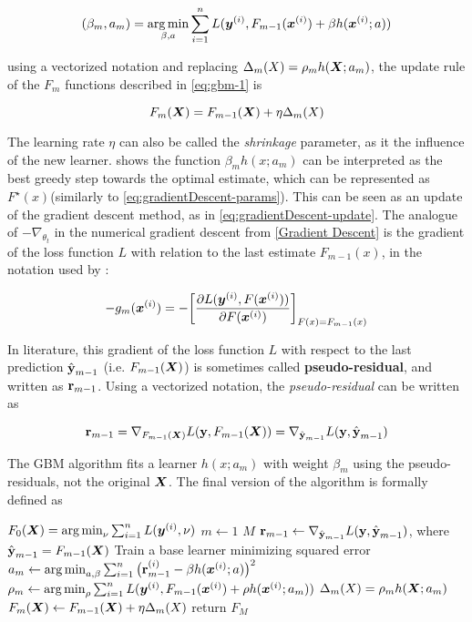 \begin{equation*}
    (\beta_m, a_m) = \operatorname*{arg\,min}_{\beta, a} \sum_{i=1}^n L(\bm{y}^{(i)}, F_{m-1}(\bm{x}^{(i)}) + \beta h(\bm{x}^{(i)}; a))
\end{equation*}

using a vectorized notation and replacing $\Delta_m(X) =\rho_m h(\bm{X}; a_m)$,  the update rule of the $F_m$ functions described in \ref{eq:gbm-1} is

\begin{equation}\label{eq:gbm-eta}
    F_m(\bm{X}) = F_{m-1}(\bm{X}) + \eta \Delta_m(X)
\end{equation}

The learning rate $\eta$ can also be called the \textit{shrinkage} parameter, as it  the influence of the new learner. \cite{gbmdef} shows the function $\beta_mh(x; a_m)$ can be interpreted as the best greedy step towards the optimal estimate, which can be represented as $F^\star(x)$(similarly to \ref{eq:gradientDescent-params}). This can be seen as an update of the gradient descent method, as in \ref{eq:gradientDescent-update}. The analogue of $-\nabla_{\theta_{t}}$ in the numerical gradient descent from \ref{Gradient Descent} is the gradient of the loss function $L$ with relation to the last estimate $F_{m-1}(x)$, in the notation used by \cite{gbmdef}:

\begin{equation*}
    -g_m(\bm{x}^{(i)}) = -\bigg[\frac{\partial L(\bm{y}^{(i)}, F(\bm{x}^{(i)}))}{\partial F(\bm{x}^{(i)})}\bigg]_{F(x)=F_{m-1}(x)}
\end{equation*}

In literature, this gradient of the loss function $L$ with respect to the last prediction $\hat{\textbf{{\text{\textup{y}}}}}_{m-1}$ (i.e. $F_{m-1}(\bm{X})$) is sometimes called \textbf{pseudo-residual}, and written as $\textbf{{\text{\textup{r}}}}_{m-1}$. Using a vectorized notation, the \textit{pseudo-residual} can be written as

\begin{equation*}
    \textbf{{\text{\textup{r}}}}_{m-1} = \nabla_{F_{m-1}(\bm{X})}L(\textbf{\text{\textup{y}}}, F_{m-1}(\bm{X})) = \nabla_{\hat{\textbf{{\text{\textup{y}}}}}_{m-1}}L(\textbf{\text{\textup{y}}},\hat{\textbf{{\text{\textup{y}}}}}_{m-1})
\end{equation*}


The GBM algorithm fits a learner $h(x; a_m)$ with weight $\beta_m$ using the pseudo-residuals, not the original $\bm{X}$. The final version of the algorithm is formally defined as

\begin{codebox}
    \li $F_0(\bm{X}) = \operatorname*{arg\,min}_{\nu}\sum_{i=1}^n L(\bm{y}^{(i)}, \nu)$
    \li \For $m \gets 1$ \To $M$
    \li     \Do
                $\textbf{{\text{\textup{r}}}}_{m-1} \gets \nabla_{\hat{\textbf{{\text{\textup{y}}}}}_{m-1}}L(\textbf{\text{\textup{y}}},\hat{\textbf{{\text{\textup{y}}}}}_{m-1})$, where $\hat{\textbf{{\text{\textup{y}}}}}_{m-1}=F_{m-1}(\bm{X})$
    \li         \Comment Train a base learner minimizing squared error
    \li         $a_m \gets \operatorname*{arg\,min}_{a, \beta}\sum_{i=1}^n\big(\textbf{{\text{\textup{r}}}}_{m-1}^{(i)}-\beta h(\bm{x}^{(i)};a)\big)^2$
    \li         $\rho_m \gets \operatorname*{arg\,min}_{\rho}\sum_{i=1}^n L(\bm{y}^{(i)}, F_{m-1}(\bm{x}^{(i)}) + \rho h(\bm{x}^{(i)};a_m))$
    \li         $\Delta_m(X) =\rho_m h(\bm{X}; a_m)$
    \li         $F_m(\bm{X}) \gets F_{m-1}(\bm{X}) + \eta \Delta_m(X)$
            \End
    \li return $F_M$
    \end{codebox}
    
